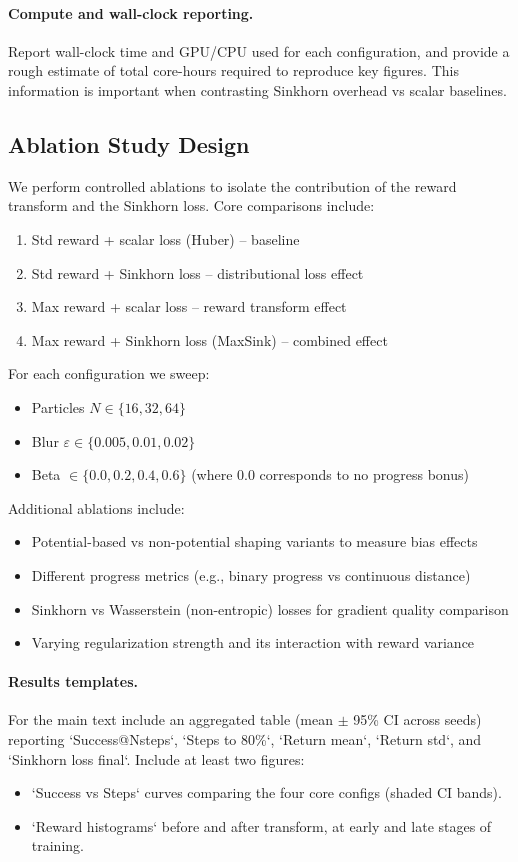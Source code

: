 \documentclass[10pt,twocolumn]{article}
\begin{document}
\paragraph{Compute and wall-clock reporting.} Report wall-clock time and GPU/CPU used for each configuration, and provide a rough estimate of total core-hours required to reproduce key figures. This information is important when contrasting Sinkhorn overhead vs scalar baselines.

\subsection{Ablation Study Design}
We perform controlled ablations to isolate the contribution of the reward transform and the Sinkhorn loss. Core comparisons include:
\begin{enumerate}
  \item Std reward + scalar loss (Huber) -- baseline
  \item Std reward + Sinkhorn loss -- distributional loss effect
  \item Max reward + scalar loss -- reward transform effect
  \item Max reward + Sinkhorn loss (MaxSink) -- combined effect
\end{enumerate}

For each configuration we sweep:
\begin{itemize}
  \item Particles $N\in\{16,32,64\}$
  \item Blur $\varepsilon\in\{0.005,0.01,0.02\}$
  \item Beta $\in\{0.0,0.2,0.4,0.6\}$ (where 0.0 corresponds to no progress bonus)
\end{itemize}

Additional ablations include:
\begin{itemize}
  \item Potential-based vs non-potential shaping variants to measure bias effects
  \item Different progress metrics (e.g., binary progress vs continuous distance)
  \item Sinkhorn vs Wasserstein (non-entropic) losses for gradient quality comparison
  \item Varying regularization strength and its interaction with reward variance
\end{itemize}

\paragraph{Results templates.} For the main text include an aggregated table (mean $\pm$ 95\% CI across seeds) reporting `Success@Nsteps`, `Steps to 80\%`, `Return mean`, `Return std`, and `Sinkhorn loss final`. Include at least two figures:
\begin{itemize}
  \item `Success vs Steps` curves comparing the four core configs (shaded CI bands).
  \item `Reward histograms` before and after transform, at early and late stages of training.
\end{itemize}
\end{document}
